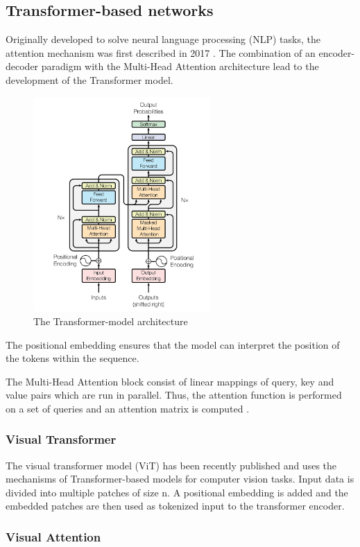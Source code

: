 \subsection{Transformer-based networks}

Originally developed to solve neural language processing (NLP) tasks, the attention mechanism was first described in 2017 \cite{vaswani_attention_2023}.
The combination of an encoder-decoder paradigm with the Multi-Head Attention architecture lead to the development of the Transformer model.

\begin{figure}
    \centering
    \includegraphics[width=0.6\textwidth]{Figures/Transformer.png}
    \caption{The Transformer-model architecture \cite{vaswani_attention_2023}}
    \label{fig:transformer_model}
\end{figure}

The positional embedding ensures that the model can interpret the position of the tokens within the sequence.

The Multi-Head Attention block consist of linear mappings of query, key and value pairs which are run in parallel. Thus, the attention function is performed on a set of queries and an attention matrix is computed \cite{vaswani_attention_2023}.

\subsubsection{Visual Transformer}

The visual transformer model (ViT) has been recently published \cite{dosovitskiy_image_2021} and uses the mechanisms of Transformer-based models for computer vision tasks. Input data is divided into multiple patches of size n. A positional embedding is added and the embedded patches are then used as tokenized input to the transformer encoder. 


\subsubsection{Visual Attention}